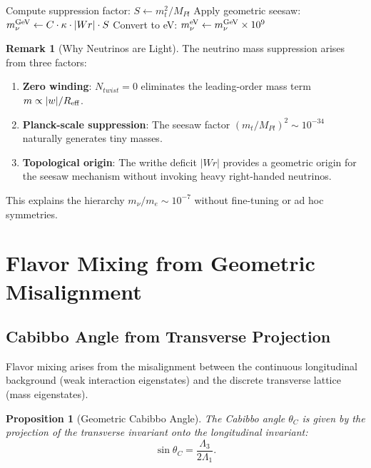 \documentclass[12pt, a4paper]{article}
\newtheorem{proposition}[theorem]{Proposition}
\theoremstyle{definition}
\newtheorem{remark}[theorem]{Remark}
\begin{document}
\begin{algorithm}[H]
\SetAlgoLined
{}
Compute suppression factor: $S \gets m_t^2 / M_{Pl}$\;
Apply geometric seesaw: $m_\nu^{\rm GeV} \gets C \cdot \kappa \cdot |Wr| \cdot S$\;
Convert to eV: $m_\nu^{\rm eV} \gets m_\nu^{\rm GeV} \times 10^9$\;
\caption{Geometric Seesaw: Calculation of Absolute Neutrino Mass Scale}
\label{alg:neutrino-mass}
\end{algorithm}

\begin{remark}[Why Neutrinos are Light]
The neutrino mass suppression arises from three factors:
\begin{enumerate}
    \item \textbf{Zero winding}: $N_{twist} = 0$ eliminates the leading-order mass term $m \propto |w|/R_{\rm eff}$.
    \item \textbf{Planck-scale suppression}: The seesaw factor $(m_t/M_{Pl})^2 \sim 10^{-34}$ naturally generates tiny masses.
    \item \textbf{Topological origin}: The writhe deficit $|Wr|$ provides a geometric origin for the seesaw mechanism without invoking heavy right-handed neutrinos.
\end{enumerate}
This explains the hierarchy $m_\nu/m_e \sim 10^{-7}$ without fine-tuning or ad hoc symmetries.
\end{remark}

\section{Flavor Mixing from Geometric Misalignment}
\label{sec:mixing}

\subsection{Cabibbo Angle from Transverse Projection}
Flavor mixing arises from the misalignment between the continuous longitudinal background (weak interaction eigenstates) and the discrete transverse lattice (mass eigenstates).

\begin{proposition}[Geometric Cabibbo Angle]
The Cabibbo angle $\theta_C$ is given by the projection of the transverse invariant onto the longitudinal invariant:
\begin{equation}
\sin\theta_C = \frac{\Lambda_3}{2\Lambda_1}.
\label{eq:cabibbo}
\end{equation}
\end{proposition}
\end{document}
